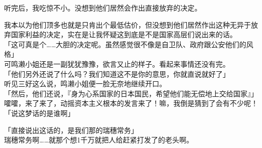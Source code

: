 听完后，我吃惊不小。没想到他们居然会作出直接放弃的决定。

我本以为他们顶多也就是只肯出个最低估价，但没想到他们居然作出这种无异于放弃国家利益的决定，实在是让我怀疑这到底是不是国家高层们说出来的话。\\

「这可真是个……大胆的决定呢。虽然感觉很不像是自卫队、政府跟公安他们的风格」\\

可鸣濑小姐还是一副犹犹豫豫，欲言又止的样子。看起来事情还没有完。\\

「他们另外还说了什么吗？我们知道这不是你的意思，你就直说就好了」\\

听见三好这么说，鸣濑小姐便一脸无奈地继续开口。\\

「然后，他们还说，『身为心系国家的日本国民，希望他们能无偿地上交给国家』」\\

嚯嚯，来了来了，动摇资本主义根本的发言来了！嘛，我倒是猜到了会有不少呢！\\

「说这梦话的是谁啊」

「直接说出这话的，是我们那的瑞穗常务」\\

瑞穗常务啊……就那个想1千万就把人给赶紧打发了的老头啊。

